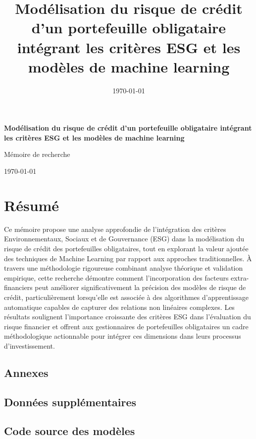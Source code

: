 \documentclass[12pt,a4paper]{report}
\title{\LARGE\textbf{Modélisation du risque de crédit d'un portefeuille obligataire intégrant les critères ESG et les modèles de machine learning}}
\author{}
\date{\today}
\begin{document}
\begin{titlepage}
  \centering
  \vspace*{2cm}
  {\huge\bfseries Modélisation du risque de crédit d'un portefeuille obligataire intégrant les critères ESG et les modèles de machine learning \par}
  \vspace{2cm}
  {\Large Mémoire de recherche \par}
  \vspace{1.5cm}
  \vfill
  {\large \today\par}
\end{titlepage}

\chapter*{Résumé}

Ce mémoire propose une analyse approfondie de l'intégration des critères Environnementaux, Sociaux et de Gouvernance (ESG) dans la modélisation du risque de crédit des portefeuilles obligataires, tout en explorant la valeur ajoutée des techniques de Machine Learning par rapport aux approches traditionnelles. À travers une méthodologie rigoureuse combinant analyse théorique et validation empirique, cette recherche démontre comment l'incorporation des facteurs extra-financiers peut améliorer significativement la précision des modèles de risque de crédit, particulièrement lorsqu'elle est associée à des algorithmes d'apprentissage automatique capables de capturer des relations non linéaires complexes. Les résultats soulignent l'importance croissante des critères ESG dans l'évaluation du risque financier et offrent aux gestionnaires de portefeuilles obligataires un cadre méthodologique actionnable pour intégrer ces dimensions dans leurs processus d'investissement.

\tableofcontents
\listoffigures
\listoftables












\begin{appendix}
\chapter{Annexes}
\section{Données supplémentaires}
\section{Code source des modèles}
\end{appendix}
\end{document}
